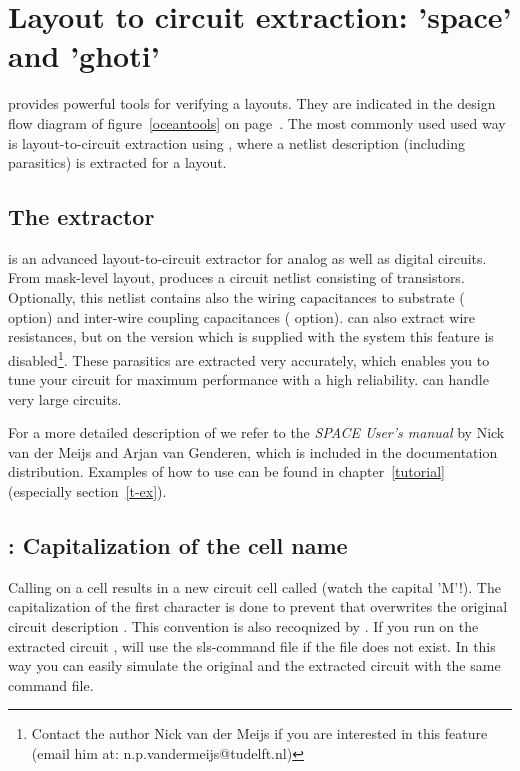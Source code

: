 
\chapter{Layout to circuit extraction: 'space' and 'ghoti'}
\label{extraction}
 provides powerful tools for verifying a layouts. They are indicated
in the design flow diagram of figure~\ref{oceantools} on
page~\pageref{oceantools}. The most commonly used 
used way is layout-to-circuit extraction using , where a netlist
description (including parasitics) is extracted for a layout.

\section{The extractor }
 is an advanced layout-to-circuit extractor for analog as well as
digital circuits. From mask-level layout,  produces a circuit
netlist consisting of transistors. Optionally, this netlist contains also the
wiring capacitances to substrate ( option) and inter-wire coupling
capacitances ( option).  can also extract wire
resistances, but on the version which is supplied with the  system
this feature is disabled\footnote{Contact the author Nick van der Meijs if you
are interested in this feature (email him at: n.p.vandermeijs@tudelft.nl)}.
These parasitics are extracted very accurately, which enables you to tune your
circuit for maximum performance with a high reliability.  can
handle very large circuits.

For a more detailed description of  we refer to the {\em
SPACE User's manual} by Nick van der Meijs and Arjan van Genderen, which is
included in the  documentation distribution. 
Examples of how to use  can be found in chapter~\ref{tutorial}
(especially section~\ref{t-ex}). 

\section{: Capitalization of the cell name}
Calling  on a cell  results in a new circuit cell
called  (watch the capital 'M'!). The capitalization of the
first character is done to prevent that  overwrites the original
circuit description . 
This convention is also recoqnized by . If you run 
on the extracted circuit ,  will use the sls-command
file  if the file  does not exist. In this
way you can easily simulate the original and the extracted circuit with the
same command file.


